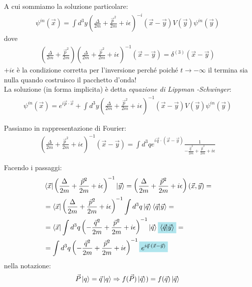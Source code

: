 \documentclass[../../FisicaTeorica.tex]{subfiles}
\begin{document}
A cui sommiamo la soluzione particolare:
\begin{align*}
\psi^{in}(\vec{x})=\int d^3 y \left(\frac{\Delta}{2m} + \frac{\vec{p}^2}{2m} + i\epsilon \right)^{-i} (\vec{x}-\vec{y})V(\vec{y})\psi^{in}(\vec{y})
\end{align*}
dove
\begin{align*}
\left(\frac{\Delta}{2m} + \frac{\vec{p}^2}{2m}\right) \left(\frac{\Delta}{2m} + \frac{\vec{p}^2}{2m} + i\epsilon
\right)^{-1} (\vec{x}-\vec{y}) = \delta^{(3)}(\vec{x}-\vec{y})
\end{align*}
$+i\epsilon$ è la condizione corretta per l'inversione perché poiché $t\to -\infty$ il termina sia nulla quando costruisco il pacchetto d'onda!
\\

La soluzione (in forma implicita) è detta \textit{equazione di Lippman -Schwinger}:
\begin{align*}
\psi^{in}(\vec{x}) = e^{i\vec{p}\cdot \vec{x}} + \int d^3 y \left( \frac{\Delta}{2m} + \frac{\vec{p}^2}{2m} + i\epsilon\right)^{-1} (\vec{x}-\vec{y})V(\vec{y})\psi^{in}(\vec{y})
\end{align*}

Passiamo in rappresentazione di Fourier:
\begin{align*}
\left(\frac{\Delta}{2m} + \frac{\vec{p}^2}{2m} + i\epsilon\right)^{-1}(\vec{x}-\vec{y}) =\int d^3 q e^{i\vec{q}\cdot(\vec{x}-\vec{y})} \frac{1}{\displaystyle -\frac{\vec{q}^2}{2m}+\frac{\vec{p}^2}{2m}+i\epsilon}
\end{align*}

Facendo i passaggi:
\begin{align*}
&\bra{\vec{x}}\left(\frac{\Delta}{2m}+\frac{\vec{p}^2}{2m}+i\epsilon\right)^{-1}\ket{\vec{y}} = \left(\frac{\Delta}{2m} + \frac{\vec{p}^2}{2m} + i\epsilon \right) (\vec{x},\vec{y}) =\\
&=\bra{\vec{x}} \left(\frac{\Delta}{2m} + \frac{\vec{p}^2}{2m} + i\epsilon \right)^{-1}\int d^3 q \ket{\vec{q}}\braket{\vec{q}|\vec{y}}=\\
&=\bra{\vec{x}} \int d^3 q \left(-\frac{\vec{q}^2}{2m}+\frac{\vec{p}^2}{2m}+i\epsilon \right)^{-1}\ket{\vec{q}}\hlc{SkyBlue}{\braket{\vec{q}|\vec{y}}} =\\
&= \int d^3 q \left(-\frac{\vec{q}^2}{2m}+\frac{\vec{p}^2}{2m}+i\epsilon\right)^{-1} \hlc{SkyBlue}{e^{i\vec{q}\cdot(\vec{x}-\vec{y})}}
\end{align*}
nella notazione:
\begin{align*}
\vec{P}\ket{q} = \vec{q}\ket{q} \Rightarrow  f(\vec{P})\ket{\vec{q}} ) = f(\vec{q})\ket{\vec{q}}
\end{align*}
\end{document}
